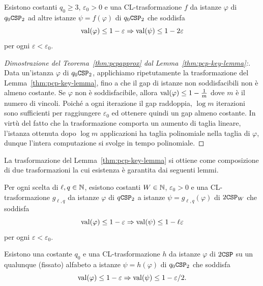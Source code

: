 \begin{lemma} \label{thm:pcp-key-lemma}
	Esistono costanti $q_0 \ge 3$, $\varepsilon_0 > 0$ e una CL-trasformazione $f$
	da istanze $\varphi$ di $q_0\mathtt{CSP}_2$ ad altre istanze $\psi = f(\varphi)$ di
	$q_0\mathtt{CSP}_2$ che soddisfa
	\[
		\operatorname{val}(\varphi) \le 1 - \varepsilon \Rightarrow \operatorname{val}(\psi) \le 1 - 2 \varepsilon
	\]
	per ogni $\varepsilon < \varepsilon_0$.
\end{lemma}

\begin{proof}[Dimostrazione del Teorema~\ref{thm:pcpapprox}
	dal Lemma~\ref{thm:pcp-key-lemma}:]
	Data un'istanza $\varphi$ di $q_0\mathtt{CSP}_2$, applichiamo ripetutamente la
	trasformazione del Lemma~\ref{thm:pcp-key-lemma}, fino a che il gap di istanze
	non soddisfacibili non è almeno costante. Se $\varphi$ non è soddisfacibile,
	allora $\operatorname{val}(\varphi) \le 1 - \frac1{m}$ dove $m$ è il numero di vincoli.
	Poiché a ogni iterazione il gap raddoppia, $\log m$ iterazioni sono
	sufficienti per raggiungere $\varepsilon_0$ ed ottenere quindi un gap almeno
	costante. In virtù del fatto che la trasformazione comporta un aumento di
	taglia lineare, l'istanza ottenuta dopo $\log m$ applicazioni ha taglia
	polinomiale nella taglia di $\varphi$, dunque l'intera computazione si svolge
	in tempo polinomiale.
\end{proof}

La trasformazione del Lemma~\ref{thm:pcp-key-lemma} si ottiene come composizione
di due trasformazioni la cui esistenza è garantita dai seguenti lemmi.

\begin{lemma} \label{thm:gap-amplification}
	Per ogni scelta di $\ell, q \in \mathbb{N}$, esistono costanti $W \in \mathbb{N}$,
	$\varepsilon_0 > 0$ e una CL-trasformazione $g_{\ell, q}$ da istanze $\varphi$
	di $q\mathtt{CSP}_2$ a istanze $\psi = g_{\ell, q}(\varphi)$ di
	$2\mathtt{CSP}_W$ che soddisfa
	\[
		\operatorname{val}(\varphi) \le 1 - \varepsilon \Rightarrow \operatorname{val}(\psi) \le 1 - \ell \varepsilon
	\]
	per ogni $\varepsilon < \varepsilon_0$.
\end{lemma}

\begin{lemma} \label{thm:alphabet-reduction}
	Esistono una costante $q_0$ e una CL-trasformazione $h$ da istanze $\varphi$
	di $2\mathtt{CSP}$ su un qualunque (fissato) alfabeto a istanze $\psi = h(\varphi)$
	di $q_0 \mathtt{CSP}_2$ che soddisfa
	\[
		\operatorname{val}(\varphi) \le 1 - \varepsilon \Rightarrow \operatorname{val}(\psi) \le 1 - \varepsilon / 2.
	\]
\end{lemma}

